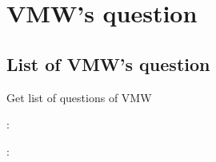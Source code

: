 \documentclass[letterpaper,10pt,english,openany,oneside]{sphinxmanual}
\begin{document}
\section{VMW’s question}
\label{\detokenize{api-qa/v1:vmw-s-question}}

\subsection{List of VMW’s question}
\label{\detokenize{api-qa/v1:list-of-vmw-s-question}}

\begin{fulllineitems}
\label{\detokenize{api-qa/v1:post--api-qa-v1-VMW-list}}
\sphinxAtStartPar
Get list of questions of VMW

\sphinxAtStartPar
{}:

\begin{sphinxVerbatim}[commandchars=\\\{\}]
   
   
   
   
\end{sphinxVerbatim}

\sphinxAtStartPar
{}:


\end{fulllineitems}
\end{document}
